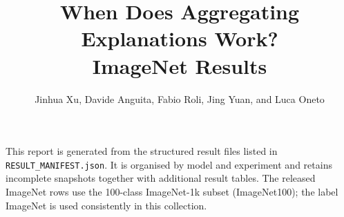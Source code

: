 \documentclass[10pt,a4paper]{article}
\title{When Does Aggregating Explanations Work?\\\large ImageNet Results}
\author{Jinhua Xu, Davide Anguita, Fabio Roli, Jing Yuan, and Luca Oneto}
\date{}
\begin{document}
\maketitle

\noindent
This report is generated from the structured result files listed in
\texttt{RESULT\_MANIFEST.json}. It is organised by model and experiment
and retains incomplete snapshots together with additional result tables.
 The released ImageNet rows use the 100-class ImageNet-1k subset (ImageNet100); the label ImageNet is used consistently in this collection.

\end{document}
